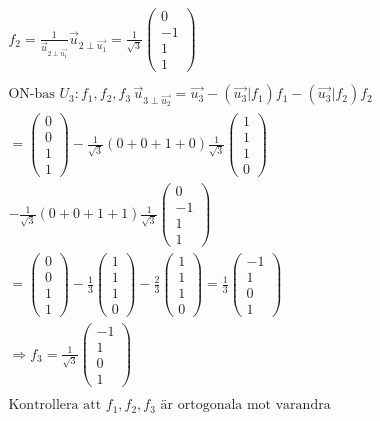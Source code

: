 \begin{multicols}{2}
\begin{align*}
  &f_2 = \frac{1}{\vec{u}_{2\perp\vec{u_1}}}\vec{u}_{2\perp\vec{u_1}} 
  = \frac{1}{\sqrt{3}}\begin{pmatrix} 0 \\ -1 \\ 1 \\ 1 \end{pmatrix}  \\
  &\\
  &\text{ON-bas } U_3: f_1,f_2,f_3 \, \vec{u}_{3\perp\vec{u_2}}
  = \vec{u_3} - (\vec{u_3}|f_1)f_1 - (\vec{u_3}|f_2)f_2 \\
  &= \begin{pmatrix} 0 \\ 0 \\ 1 \\ 1 \end{pmatrix}
  - \frac{1}{\sqrt{3}}(0+0+1+0)\frac{1}{\sqrt{3}}\begin{pmatrix} 1 \\ 1 \\ 1 \\ 0 \end{pmatrix} \\
  &- \frac{1}{\sqrt{3}}(0+0+1+1)\frac{1}{\sqrt{3}}\begin{pmatrix} 0 \\ -1 \\ 1 \\ 1 \end{pmatrix} \\
  &=  \begin{pmatrix} 0 \\ 0 \\ 1 \\ 1 \end{pmatrix}
  - \frac{1}{3}\begin{pmatrix} 1 \\ 1 \\ 1 \\ 0 \end{pmatrix}
  - \frac{2}{3}\begin{pmatrix} 1 \\ 1 \\ 1 \\ 0 \end{pmatrix}
  = \frac{1}{3}\begin{pmatrix} -1 \\ 1 \\ 0 \\ 1 \end{pmatrix} \\
  &\Rightarrow  f_3 = \frac{1}{\sqrt{3}}\begin{pmatrix} -1 \\ 1 \\ 0 \\ 1 \end{pmatrix} \\
  &\\
  &\text{Kontrollera att $f_1, f_2, f_3$ är ortogonala mot varandra} \\
\end{align*}



\end{multicols}
